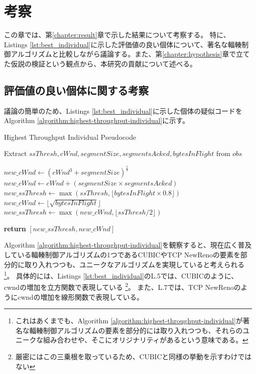 \documentclass[a4paper,11pt]{jreport}
\newcommand{\chapref}[1]{第\ref{#1}章}
\newcommand{\algorithmref}[1]{Algorithm \ref{#1}}
\begin{document}
\chapter{考察}
\label{chapter:discussion}
この章では、\chapref{chapter:result}で示した結果について考察する。
特に、Listings \ref{lst:best_individual}に示した評価値の良い個体について、著名な輻輳制御アルゴリズムと比較しながら議論する。また、\chapref{chapter:hypothesis}で立てた仮説の検証という観点から、本研究の貢献について述べる。

\section{評価値の良い個体に関する考察}
議論の簡単のため、Listings \ref{lst:best_individual}に示した個体の疑似コードを\algorithmref{algorithm:highest-throughput-individual}に示す。
\begin{algorithm}
  \caption{Highest Throughput Individual Pseudocode}
  \label{algorithm:highest-throughput-individual}
  \begin{algorithmic}[1]

      \State Extract $ssThresh, cWnd, segmentSize, segmentsAcked, bytesInFlight$ from $obs$

              \State $new\_cWnd \gets (cWnd^3 + segmentSize)^{\frac{1}{3}}$
          \Else
              \State $new\_cWnd \gets cWnd + (segmentSize \times segmentsAcked)$
          \EndIf
          \State $new\_ssThresh \gets \max(ssThresh, \lfloor bytesInFlight \times 0.8 \rfloor)$
      \Else
          \State $new\_cWnd \gets \lfloor \sqrt{bytesInFlight} \rfloor$
          \State $new\_ssThresh \gets \max(new\_cWnd, \lfloor ssThresh / 2 \rfloor)$
      \EndIf

      \State \textbf{return} $[new\_ssThresh, new\_cWnd]$
  \EndProcedure

  \end{algorithmic}
\end{algorithm}
\algorithmref{algorithm:highest-throughput-individual}を観察すると、現在広く普及している輻輳制御アルゴリズムの1つであるCUBIC\cite{cubic}やTCP NewReno\cite{floyd2004newreno,henderson2012newreno}の要素を部分的に取り入れつつも、ユニークなアルゴリズムを実現していると考えられる
\footnote{これはあくまでも、\algorithmref{algorithm:highest-throughput-individual}が著名な輻輳制御アルゴリズムの要素を部分的には取り入れつつも、それらのユニークな組み合わせや、そこにオリジナリティがあるという意味である。}。
具体的には、Listings \ref{lst:best_individual}のL.5では、CUBICのように、cwndの増加を立方関数で表現している
\footnote{厳密にはこの三乗根を取っているため、CUBICと同様の挙動を示すわけではない}。
また、L.7では、TCP NewRenoのようにcwndの増加を線形関数で表現している。
\end{document}
